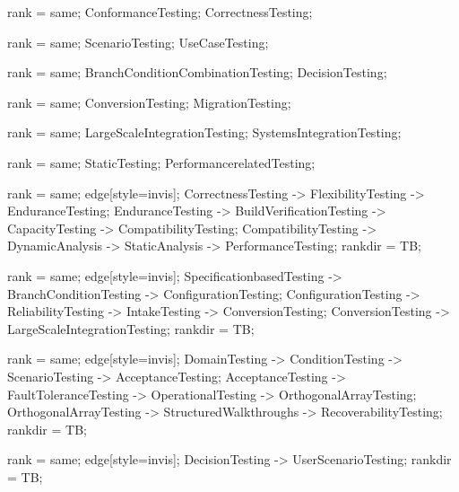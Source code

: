 \documentclass{article}
\begin{document}
{{
rank = same;
ConformanceTesting;
CorrectnessTesting;
}

{
rank = same;
ScenarioTesting;
UseCaseTesting;
}

{
rank = same;
BranchConditionCombinationTesting;
DecisionTesting;
}

{
rank = same;
ConversionTesting;
MigrationTesting;
}

{
rank = same;
LargeScaleIntegrationTesting;
SystemsIntegrationTesting;
}

{
rank = same;
StaticTesting;
PerformancerelatedTesting;
}

{
rank = same;
edge[style=invis];
CorrectnessTesting -> FlexibilityTesting -> EnduranceTesting;
EnduranceTesting -> BuildVerificationTesting -> CapacityTesting -> CompatibilityTesting;
CompatibilityTesting -> DynamicAnalysis -> StaticAnalysis -> PerformanceTesting;
rankdir = TB;
}

{
rank = same;
edge[style=invis];
SpecificationbasedTesting -> BranchConditionTesting -> ConfigurationTesting;
ConfigurationTesting -> ReliabilityTesting -> IntakeTesting -> ConversionTesting;
ConversionTesting -> LargeScaleIntegrationTesting;
rankdir = TB;
}

{
rank = same;
edge[style=invis];
DomainTesting -> ConditionTesting -> ScenarioTesting -> AcceptanceTesting;
AcceptanceTesting -> FaultToleranceTesting -> OperationalTesting -> OrthogonalArrayTesting;
OrthogonalArrayTesting -> StructuredWalkthroughs -> RecoverabilityTesting;
rankdir = TB;
}

{
rank = same;
edge[style=invis];
DecisionTesting -> UserScenarioTesting;
rankdir = TB;
}

}
\end{document}
